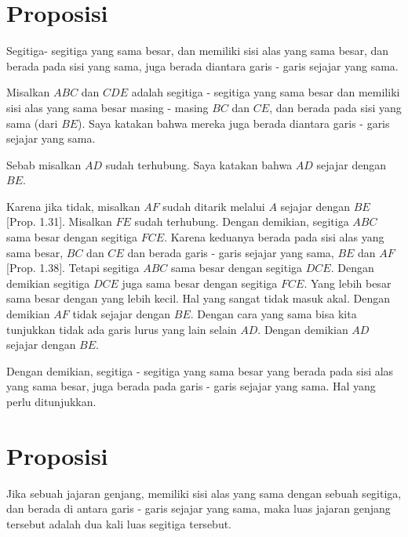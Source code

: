 \documentclass[a4paper]{book}
\begin{document}
\section*{\centering Proposisi \thesection} 
Segitiga- segitiga yang sama besar, dan memiliki sisi alas yang sama besar, dan 
berada pada sisi yang sama, juga berada diantara garis - garis sejajar yang
sama.
\begin{center}
\end{center}
Misalkan $ABC$ dan $CDE$ adalah segitiga - segitiga yang sama besar dan 
memiliki sisi alas yang sama besar masing - masing $BC$ dan $CE$, dan 
berada pada sisi yang sama (dari $BE$). Saya katakan bahwa mereka juga berada 
diantara garis - garis sejajar yang sama.

Sebab misalkan $AD$ sudah terhubung. Saya katakan bahwa $AD$ sejajar 
dengan $BE$.

Karena jika tidak, misalkan $AF$ sudah ditarik melalui $A$ sejajar 
dengan $BE$ [Prop. 1.31]. Misalkan $FE$ sudah terhubung. Dengan demikian,
segitiga $ABC$ sama besar dengan segitiga $FCE$. Karena keduanya berada
pada sisi alas yang sama besar, $BC$ dan $CE$ dan berada garis - garis
sejajar yang sama, $BE$ dan $AF$ [Prop. 1.38]. Tetapi segitiga $ABC$
sama besar dengan  segitiga $DCE$. Dengan demikian segitiga $DCE$ juga
sama besar dengan segitiga $FCE$. Yang lebih besar sama besar dengan yang
lebih kecil. Hal yang sangat tidak masuk akal. Dengan demikian $AF$ tidak
sejajar dengan $BE$. Dengan cara yang sama bisa kita tunjukkan tidak ada
garis lurus yang lain selain $AD$. Dengan demikian $AD$ sejajar dengan 
$BE$.

Dengan demikian, segitiga - segitiga yang sama besar yang berada pada
sisi alas yang sama besar, juga berada pada garis - garis sejajar yang
sama. Hal yang perlu ditunjukkan.


\section*{\centering Proposisi \thesection} 
Jika sebuah jajaran genjang, memiliki sisi alas yang sama dengan sebuah
segitiga, dan berada di antara garis - garis sejajar yang sama, maka luas
jajaran genjang tersebut adalah dua kali luas segitiga tersebut.
\end{document}
